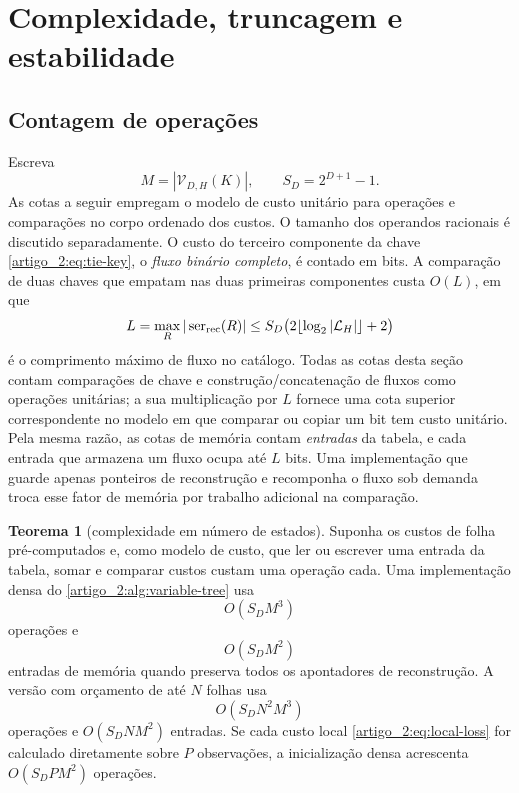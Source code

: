 \documentclass[12pt,a4paper]{article}
\theoremstyle{preciso}
\theoremstyle{definition}
\newcommand{\ser}{\operatorname{ser}}
\newcommand{\Library}{\mathcal{L}}
\newcommand{\Values}{\mathcal{V}}
\theoremstyle{preciso}
\newtheorem{theorem}[teorema]{Teorema}
\theoremstyle{preciso}
\theoremstyle{preciso}
\theoremstyle{preciso}
\theoremstyle{definition}
\theoremstyle{preciso}
\theoremstyle{definition}
\theoremstyle{preciso}
\theoremstyle{preciso}
\theoremstyle{definition}
\begin{document}
\section{Complexidade, truncagem e estabilidade}
\label{artigo_2:sec:complexity-dp}

\subsection{Contagem de operações}

Escreva
\[
 M=|\Values_{D,H}(K)|,\qquad S_D=2^{D+1}-1.
\]
As cotas a seguir empregam o modelo de custo unitário para operações e comparações
no corpo ordenado dos custos. O tamanho dos operandos racionais é discutido
separadamente. O custo do terceiro componente da chave \eqref{artigo_2:eq:tie-key}, o
\emph{fluxo binário completo}, é contado em bits. A comparação de duas
chaves que empatam nas duas primeiras componentes custa
$O(L)$, em que
\begin{equation}
 L=\max_R|\ser_{\rm rec}(R)|
 \le S_D\bigl(2\lfloor\log_2|\Library_H|\rfloor+2\bigr)
 \label{artigo_2:eq:stream-length}
\end{equation}
é o comprimento máximo de fluxo no catálogo. Todas as cotas desta seção contam
comparações de chave e construção/concatenação de fluxos como operações unitárias;
a sua multiplicação por $L$ fornece uma cota superior correspondente no modelo em que
comparar ou copiar um bit tem custo unitário.
Pela mesma razão, as cotas de memória contam \emph{entradas} da tabela, e cada
entrada que armazena um fluxo ocupa até $L$ bits. Uma implementação que
guarde apenas ponteiros de reconstrução e recomponha o fluxo sob demanda
troca esse fator de memória por trabalho adicional na comparação.

\begin{theorem}[complexidade em número de estados]\label{map:artigo_2:9.1}
\label{artigo_2:thm:state-complexity}
Suponha os custos de folha pré-computados e, como modelo de custo, que ler ou escrever uma entrada da tabela, somar e comparar custos custam uma operação cada. Uma implementação densa do
\cref{artigo_2:alg:variable-tree} usa
\begin{equation}
 O(S_DM^3)
 \label{artigo_2:eq:dense-time}
\end{equation}
operações e
\begin{equation}
 O(S_DM^2)
 \label{artigo_2:eq:dense-memory}
\end{equation}
entradas de memória quando preserva todos os apontadores de reconstrução.
A versão com orçamento de até $N$ folhas usa
\begin{equation}
 O(S_DN^2M^3)
 \label{artigo_2:eq:budget-time}
\end{equation}
operações e $O(S_DNM^2)$ entradas. Se cada custo local
\eqref{artigo_2:eq:local-loss} for calculado diretamente sobre $P$ observações, a
inicialização densa acrescenta $O(S_DPM^2)$ operações.
\end{theorem}
\end{document}

